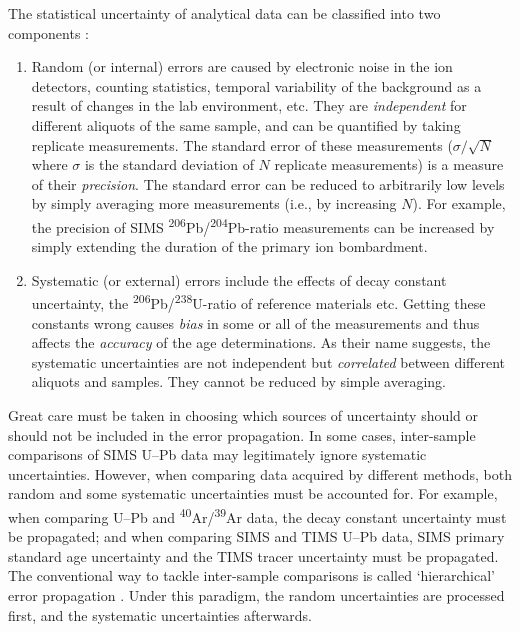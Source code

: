 \documentclass{article}
\begin{document}
The statistical uncertainty of analytical data can be classified into
two components \citep{renne1998}:

\begin{enumerate}
  \item Random (or internal) errors are caused by electronic noise in
    the ion detectors, counting statistics, temporal variability of
    the background as a result of changes in the lab environment,
    etc. They are \emph{independent} for different aliquots of the
    same sample, and can be quantified by taking replicate
    measurements. The standard error of these measurements
    ($\sigma/\sqrt{N}$ where $\sigma$ is the standard deviation of $N$
    replicate measurements) is a measure of their
    \emph{precision}. The standard error can be reduced to arbitrarily
    low levels by simply averaging more measurements (i.e., by
    increasing $N$). For example, the precision of SIMS
    \textsuperscript{206}Pb/\textsuperscript{204}Pb-ratio measurements
    can be increased by simply extending the duration of the primary
    ion bombardment.
  \item Systematic (or external) errors include the effects of decay
    constant uncertainty, the
    \textsuperscript{206}Pb/\textsuperscript{238}U-ratio of reference
    materials etc. Getting these constants wrong causes \emph{bias} in
    some or all of the measurements and thus affects the
    \emph{accuracy} of the age determinations. As their name suggests,
    the systematic uncertainties are not independent but
    \emph{correlated} between different aliquots and samples. They
    cannot be reduced by simple averaging.
\end{enumerate}

Great care must be taken in choosing which sources of uncertainty
should or should not be included in the error propagation.  In some
cases, inter-sample comparisons of SIMS U--Pb data may legitimately
ignore systematic uncertainties. However, when comparing data acquired
by different methods, both random and some systematic uncertainties
must be accounted for. For example, when comparing U--Pb and
\textsuperscript{40}Ar/\textsuperscript{39}Ar data, the decay constant
uncertainty must be propagated; and when comparing SIMS and TIMS U--Pb
data, SIMS primary standard age uncertainty and the TIMS tracer
uncertainty must be propagated. The conventional way to tackle
inter-sample comparisons is called `hierarchical' error propagation
\citep{renne1998, min2000, horstwood2016}.  Under this paradigm, the
random uncertainties are processed first, and the systematic
uncertainties afterwards.
\medskip
\end{document}
